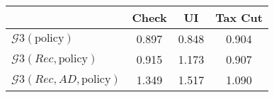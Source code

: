 \begin{tabular}{@{}lccc@{}} 
\toprule 
                          & Check      & UI    & Tax Cut    \\  \midrule 
$\mathcal{G}3(\text{policy})$ & 0.897  & 0.848  & 0.904     \\ 
$\mathcal{G}3(Rec,\text{policy})$ & 0.915  & 1.173  & 0.907     \\ 
$\mathcal{G}3(Rec, AD,\text{policy})$ & 1.349  & 1.517  & 1.090     \\ 
\end{tabular}  
